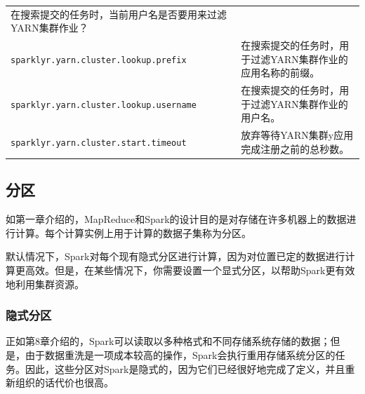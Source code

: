 \documentclass[
]{article}
\begin{document}
\begin{longtable}[]{@{}ll@{}}
\begin{minipage}[t]{0.47\columnwidth}
在搜索提交的任务时，当前用户名是否要用来过滤YARN集群作业？\strut
\end{minipage}\tabularnewline
\begin{minipage}[t]{0.47\columnwidth}\raggedright
\texttt{sparklyr.yarn.cluster.lookup.prefix}\strut
\end{minipage} & \begin{minipage}[t]{0.47\columnwidth}\raggedright
在搜索提交的任务时，用于过滤YARN集群作业的应用名称的前缀。\strut
\end{minipage}\tabularnewline
\begin{minipage}[t]{0.47\columnwidth}\raggedright
\texttt{sparklyr.yarn.cluster.lookup.username}\strut
\end{minipage} & \begin{minipage}[t]{0.47\columnwidth}\raggedright
在搜索提交的任务时，用于过滤YARN集群作业的用户名。\strut
\end{minipage}\tabularnewline
\begin{minipage}[t]{0.47\columnwidth}\raggedright
\texttt{sparklyr.yarn.cluster.start.timeout}\strut
\end{minipage} & \begin{minipage}[t]{0.47\columnwidth}\raggedright
放弃等待YARN集群y应用完成注册之前的总秒数。\strut
\end{minipage}\tabularnewline
\bottomrule
\end{longtable}

\hypertarget{ux5206ux533a}{%
\subsection{分区}\label{ux5206ux533a}}

如第一章介绍的，MapReduce和Spark的设计目的是对存储在许多机器上的数据进行计算。每个计算实例上用于计算的数据子集称为分区。

默认情况下，Spark对每个现有隐式分区进行计算，因为对位置已定的数据进行计算更高效。但是，在某些情况下，你需要设置一个显式分区，以帮助Spark更有效地利用集群资源。

\hypertarget{ux9690ux5f0fux5206ux533a}{%
\subsubsection{隐式分区}\label{ux9690ux5f0fux5206ux533a}}

正如第8章介绍的，Spark可以读取以多种格式和不同存储系统存储的数据；但是，由于数据重洗是一项成本较高的操作，Spark会执行重用存储系统分区的任务。因此，这些分区对Spark是隐式的，因为它们已经很好地完成了定义，并且重新组织的话代价也很高。
\end{document}
